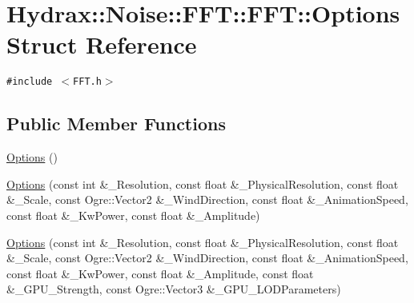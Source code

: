 \hypertarget{struct_hydrax_1_1_noise_1_1_f_f_t_1_1_options}{
\section{Hydrax::Noise::FFT::FFT::Options Struct Reference}
\label{struct_hydrax_1_1_noise_1_1_f_f_t_1_1_options}
}
{\tt \#include $<$FFT.h$>$}

\subsection*{Public Member Functions}
\begin{CompactItemize}
\item 
\hyperlink{struct_hydrax_1_1_noise_1_1_f_f_t_1_1_options_177f9a33f992a3ff0895688eaba0fc57}{Options} ()
\item 
\hyperlink{struct_hydrax_1_1_noise_1_1_f_f_t_1_1_options_7c9613db2f0a0a9037c1aaf713bb1d91}{Options} (const int \&\_\-Resolution, const float \&\_\-PhysicalResolution, const float \&\_\-Scale, const Ogre::Vector2 \&\_\-WindDirection, const float \&\_\-AnimationSpeed, const float \&\_\-KwPower, const float \&\_\-Amplitude)
\item 
\hyperlink{struct_hydrax_1_1_noise_1_1_f_f_t_1_1_options_28e1e4f8ce5958e56094139d4f7fd569}{Options} (const int \&\_\-Resolution, const float \&\_\-PhysicalResolution, const float \&\_\-Scale, const Ogre::Vector2 \&\_\-WindDirection, const float \&\_\-AnimationSpeed, const float \&\_\-KwPower, const float \&\_\-Amplitude, const float \&\_\-GPU\_\-Strength, const Ogre::Vector3 \&\_\-GPU\_\-LODParameters)
\end{CompactItemize}
